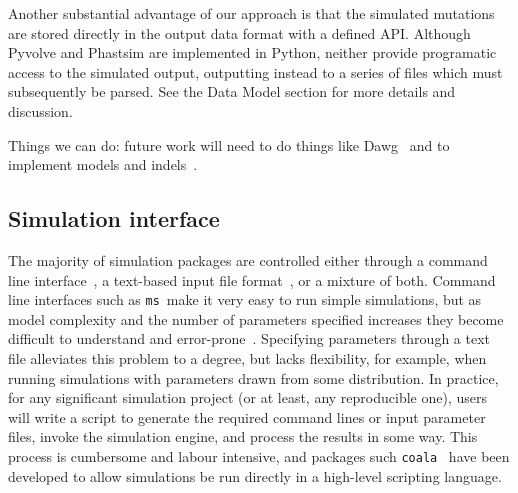 \documentclass{article}
\newcommand{\ms}[0]{\texttt{ms}}
\begin{document}
Another substantial advantage of our approach is that the simulated
mutations are stored directly in the output data format with
a defined API. Although
Pyvolve and Phastsim are implemented in Python, neither provide
programatic access to the simulated output, outputting instead
to a series of files which must subsequently be parsed.
See the Data Model section for more details and discussion.

Things we can do: future work will need to do things like
Dawg~\citep{cartwright2005dna} and to implement models and
indels~\citep{fletcher2009indelible}.

\subsection{Simulation interface}

The majority of simulation packages are controlled either through
a command line interface~\citep[e.g.][]{hudson2002generating,kern2016discoal},
a text-based input file
format~\citep[e.g.][]{guillaume2006nemo,excoffier2011fastsimcoal,shlyakhter2014cosi2},
or a mixture of both.
Command line interfaces such as \ms\ make it very easy to run simple
simulations, but as model complexity and the number of parameters specified increases
they become difficult to understand and
error-prone~\citep{ragsdale2020lessons,gower2021demes}.
Specifying parameters through a text file alleviates this problem to a degree,
but lacks flexibility, for example, when running simulations with parameters
drawn from some distribution. In practice, for any significant simulation
project (or at least, any reproducible one), users will write a script
to generate the required command lines or input parameter files,
invoke the simulation engine, and process the results in some way.
This process is cumbersome and labour intensive, and packages
such \texttt{coala}~\citep{staab2016coala} have been developed
to allow simulations be run directly in a high-level
scripting language.
\end{document}
